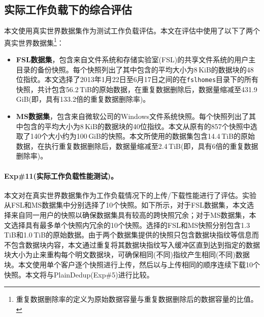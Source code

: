 \subsection{实际工作负载下的综合评估}
\label{subsec:sgxdedup-real-world}

本文使用真实世界数据集作为测试工作负载评估\sysnameS。本文在评估中使用了以下了两个真实世界数据集\footnote{重复数据删除率的定义为原始数据容量与重复数据删除后的数据容量的比值。}：

\begin{itemize}[leftmargin=0em]
  \item \textbf{FSL数据集}，包含来自文件系统和存储实验室(FSL)的共享文件系统的用户主目录的备份快照。每个快照列出了其中包含的平均大小为8\,KiB的数据块的48位指纹。本文选择了2013年1月22日至6月17日之间的在\texttt{fslhomes}目录下的所有快照，共计包含56.2\,TiB的原始数据，在重复数据删除后，数据量缩减至431.9\,GiB(即，具有133.2倍的重复数据删除率)。
  \item \textbf{MS数据集}，包含来自微软公司的Windows文件系统快照。每个快照列出了其中包含的平均大小为8\,KiB的数据块的40位指纹。本文从原有的857个快照中选取了140个大小约为100\,GiB的快照。本文所使用的数据集包含14.4\,TiB的原始数据，在执行重复数据删除后，数据量缩减至2.4\,TiB(即，具有6倍的重复数据删除率)。
\end{itemize}

\paragraph*{Exp\#11(实际工作负载性能测试)。} 本文对\sysnameS 在真实世界数据集作为工作负载情况下的上传/下载性能进行了评估。实验从FSL和MS数据集中分别选择了10个快照。如下所示，对于FSL数据集，本文选择来自同一用户的快照以确保数据集具有较高的跨快照冗余；对于MS数据集，本文选择具有最多单个快照内冗余的10个快照。选择的FSL和MS快照分别包含1.3\,TiB和1.0\,TiB的原始数据。由于两个数据集提供的快照只包含数据块指纹等信息而不包含数据块内容，本文通过重复将其数据块指纹写入缓冲区直到达到指定的数据块大小为止来重构每个明文数据块，可确保相同(不同)指纹产生相同(不同)数据块。本文使用单个客户逐个快照进行上传，然后以与上传相同的顺序连续下载10个快照。本文将\sysnameS 与PlainDedup(Exp\#5)进行比较。

